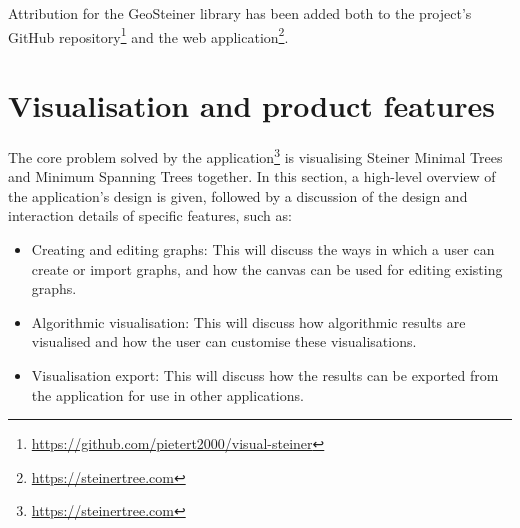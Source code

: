 \documentclass{l4proj}
\begin{document}
Attribution for the GeoSteiner library has been added both to the project's GitHub repository\footnote{\url{https://github.com/pietert2000/visual-steiner}} and the web application\footnote{\url{https://steinertree.com}}.


\chapter{Visualisation and product features}
\label{sec:visualisation_and_product_features}
The core problem solved by the application\footnote{\url{https://steinertree.com}} is visualising Steiner Minimal Trees and Minimum Spanning Trees together.
In this section, a high-level overview of the application's design is given, followed by a discussion of the design and interaction details of specific features, such as:
\begin{itemize}
    \item Creating and editing graphs: This will discuss the ways in which a user can create or import graphs, and how the canvas can be used for editing existing graphs.
    \item Algorithmic visualisation: This will discuss how algorithmic results are visualised and how the user can customise these visualisations.
    \item Visualisation export: This will discuss how the results can be exported from the application for use in other applications.
\end{itemize}
\end{document}

